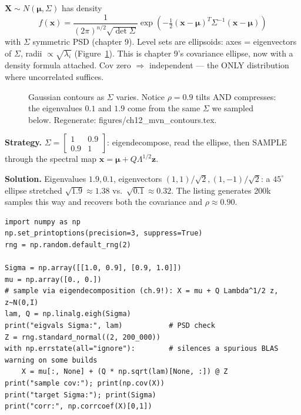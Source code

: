 $\mathbf X\sim N(\boldsymbol\mu,\Sigma)$ has density
\[
f(\mathbf x)=\frac1{(2\pi)^{n/2}\sqrt{\det\Sigma}}
\exp\!\left(-\tfrac12(\mathbf x-\boldsymbol\mu)^{T}\Sigma^{-1}
(\mathbf x-\boldsymbol\mu)\right)
\]
with $\Sigma$ symmetric PSD (chapter 9). Level sets are ellipsoids: axes
= eigenvectors of $\Sigma$, radii $\propto\sqrt{\lambda_i}$
(Figure~\ref{fig:mvncont}). This is chapter 9's covariance ellipse, now
with a density formula attached. $\mathrm{Cov}$ zero $\Rightarrow$
independent --- the ONLY distribution where uncorrelated suffices.

\begin{figure}[htbp]
\centering

\caption{Gaussian contours as $\Sigma$ varies. Notice
$\rho=0.9$ tilts AND compresses: the eigenvalues $0.1$ and $1.9$ come from
the same $\Sigma$ we sampled below. Regenerate:
\ttfamily figures/ch12\_mvn\_contours.tex.}
\label{fig:mvncont}
\end{figure}

\begin{example}\label{ex:mvncontours}
\textbf{Strategy.} $\Sigma=\begin{bmatrix}1&0.9\\0.9&1\end{bmatrix}$:
eigendecompose, read the ellipse, then SAMPLE through the spectral map
$\mathbf x=\boldsymbol\mu+Q\Lambda^{1/2}\mathbf z$.

\textbf{Solution.} Eigenvalues $1.9,0.1$, eigenvectors
$(1,1)/\sqrt2,(1,-1)/\sqrt2$: a $45^{\circ}$ ellipse stretched
$\sqrt{1.9}\approx1.38$ vs.\ $\sqrt{0.1}\approx0.32$. The listing
generates 200k samples this way and recovers both the covariance and
$\rho\approx0.90$.
\end{example}

\begin{lstlisting}[caption={\ttfamily code/ch12\_mvn\_sample.py ---
chapter 9 paying off: Gaussian sampling is eigendecomposition plus
standard normals.}]
import numpy as np
np.set_printoptions(precision=3, suppress=True)
rng = np.random.default_rng(2)

Sigma = np.array([[1.0, 0.9], [0.9, 1.0]])
mu = np.array([0., 0.])
# sample via eigendecomposition (ch.9!): X = mu + Q Lambda^1/2 z, z~N(0,I)
lam, Q = np.linalg.eigh(Sigma)
print("eigvals Sigma:", lam)           # PSD check
Z = rng.standard_normal((2, 200_000))
with np.errstate(all="ignore"):        # silences a spurious BLAS warning on some builds
    X = mu[:, None] + (Q * np.sqrt(lam)[None, :]) @ Z
print("sample cov:"); print(np.cov(X))
print("target Sigma:"); print(Sigma)
print("corr:", np.corrcoef(X)[0,1])
\end{lstlisting}

